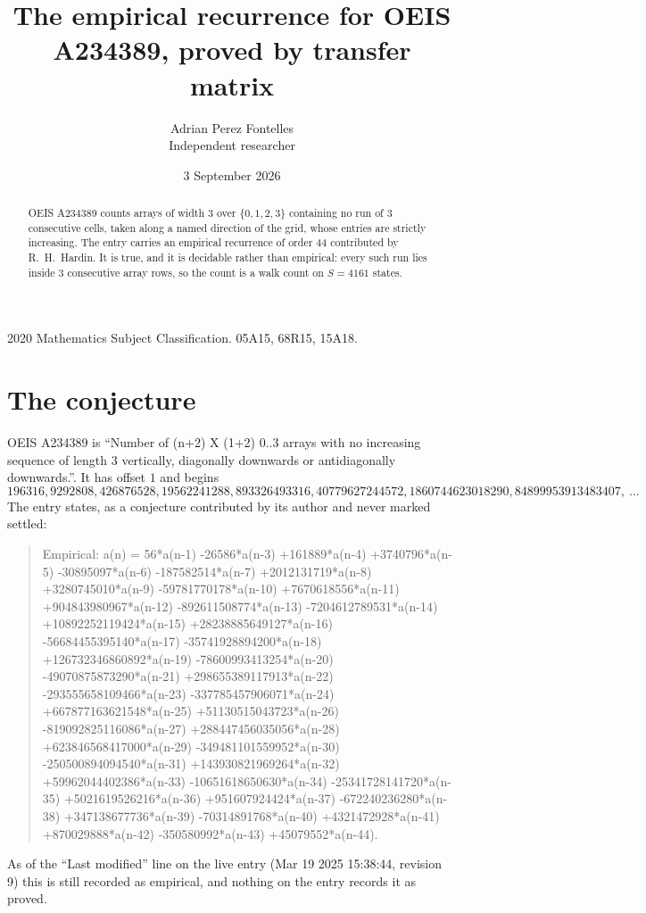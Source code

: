 \documentclass[11pt,a4paper]{article}
\title{The empirical recurrence for OEIS A234389, proved by transfer matrix}
\author{Adrian Perez Fontelles\\ \small Independent researcher}
\date{3 September 2026}
\theoremstyle{plain}
\theoremstyle{definition}
\begin{document}
\maketitle

\begin{abstract}
OEIS A234389 counts arrays of width $3$ over $\{0,1,2,3\}$ containing no run of $3$ consecutive
cells, taken along a named direction of the grid, whose entries are strictly increasing. The entry carries
an empirical recurrence of order $44$ contributed by R.~H.~Hardin. It is true, and it is
decidable rather than empirical: every such run lies inside $3$ consecutive array rows, so
the count is a walk count on $S=4161$ states.
\end{abstract}

\noindent\small 2020 Mathematics Subject Classification. 05A15, 68R15, 15A18.\normalsize

\section{The conjecture}

OEIS A234389 is ``Number of (n+2) X (1+2) 0..3 arrays with no increasing sequence of length 3 vertically, diagonally downwards or antidiagonally downwards.''. It has offset $1$ and begins
\[
196316, 9292808, 426876528, 19562241288, 893326493316, 40779627244572, 1860744623018290, 84899953913483407,\ \dots
\]
The entry states, as a conjecture contributed by its author and never marked settled:
\begin{quote}
Empirical: a(n) = 56*a(n-1) -26586*a(n-3) +161889*a(n-4) +3740796*a(n-5) -30895097*a(n-6) -187582514*a(n-7) +2012131719*a(n-8) +3280745010*a(n-9) -59781770178*a(n-10) +7670618556*a(n-11) +904843980967*a(n-12) -892611508774*a(n-13) -7204612789531*a(n-14) +10892252119424*a(n-15) +28238885649127*a(n-16) -56684455395140*a(n-17) -35741928894200*a(n-18) +126732346860892*a(n-19) -78600993413254*a(n-20) -49070875873290*a(n-21) +298655389117913*a(n-22) -293555658109466*a(n-23) -337785457906071*a(n-24) +667877163621548*a(n-25) +51130515043723*a(n-26) -819092825116086*a(n-27) +288447456035056*a(n-28) +623846568417000*a(n-29) -349481101559952*a(n-30) -250500894094540*a(n-31) +143930821969264*a(n-32) +59962044402386*a(n-33) -10651618650630*a(n-34) -25341728141720*a(n-35) +5021619526216*a(n-36) +951607924424*a(n-37) -672240236280*a(n-38) +347138677736*a(n-39) -70314891768*a(n-40) +4321472928*a(n-41) +870029888*a(n-42) -350580992*a(n-43) +45079552*a(n-44).
\end{quote}
As of the ``Last modified'' line on the live entry (Mar 19 2025 15:38:44, revision 9) this is still
recorded as empirical, and nothing on the entry records it as proved.
\end{document}
